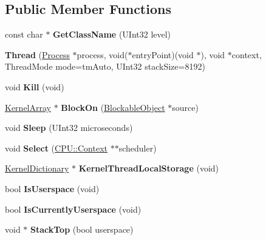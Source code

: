 \subsection*{Public Member Functions}
\begin{DoxyCompactItemize}
\item 
\mbox{\label{class_thread_aa75f2d415e51ad188550fdaec40f3869}} 
const char $\ast$ {\bfseries Get\+Class\+Name} (U\+Int32 level)
\item 
\mbox{\label{class_thread_a29f128141e905fe96081b513b4b0d56c}} 
{\bfseries Thread} (\hyperlink{class_process}{Process} $\ast$process, void($\ast$entry\+Point)(void $\ast$), void $\ast$context, Thread\+Mode mode=tm\+Auto, U\+Int32 stack\+Size=8192)
\item 
\mbox{\label{class_thread_a86ef42115b91c534b71eb6f6a1eaf20e}} 
void {\bfseries Kill} (void)
\item 
\mbox{\label{class_thread_a8ea34747e31a384a20e0098189a7227e}} 
\hyperlink{class_kernel_array}{Kernel\+Array} $\ast$ {\bfseries Block\+On} (\hyperlink{class_blockable_object}{Blockable\+Object} $\ast$source)
\item 
\mbox{\label{class_thread_a83e9f58ebbf2f097ae471d05f28e38fb}} 
void {\bfseries Sleep} (U\+Int32 microseconds)
\item 
\mbox{\label{class_thread_a3da8dd2190d3f4c8385b58492f56fc0b}} 
void {\bfseries Select} (\hyperlink{class_c_p_u_1_1_context}{C\+P\+U\+::\+Context} $\ast$$\ast$scheduler)
\item 
\mbox{\label{class_thread_a11fd56ea0c36cdb06b1741b56062a078}} 
\hyperlink{class_kernel_dictionary}{Kernel\+Dictionary} $\ast$ {\bfseries Kernel\+Thread\+Local\+Storage} (void)
\item 
\mbox{\label{class_thread_a9d1f02c41d83b9ce3d36be0777e20d7d}} 
bool {\bfseries Is\+Userspace} (void)
\item 
\mbox{\label{class_thread_a66d29f650b5cd1a7a51f000a80931fad}} 
bool {\bfseries Is\+Currently\+Userspace} (void)
\item 
\mbox{\label{class_thread_adc1dcf0eb56325d213b432973256e8a8}} 
void $\ast$ {\bfseries Stack\+Top} (bool userspace)
\end{DoxyCompactItemize}
